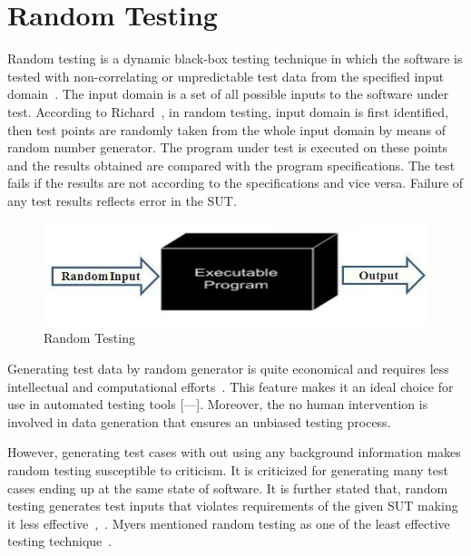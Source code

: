 {\section{Random Testing}
Random testing is a dynamic black-box testing technique in which the software is tested with non-correlating or unpredictable test data from the specified input domain~\cite{Chan2002}. The input domain is a set of all possible inputs to the software under test. According to Richard~\cite{hamlet1994}, in random testing, input domain is first identified, then test points are randomly taken from the whole input domain by means of random number generator. The program under test is executed on these points and the results obtained are compared with the program specifications. The test fails if the results are not according to the specifications and vice versa. Failure of any test results reflects error in the SUT.
\begin{figure}[h]
	\centering
	\includegraphics[scale=0.5]{Literature/randomTesting.jpg}
	\caption{Random Testing}
\end{figure}

Generating test data by random generator is quite economical and requires less intellectual and computational efforts~\cite{Ciupa2008a}. This feature makes it an ideal choice for use in automated testing tools [---]. Moreover, the no human intervention is involved in data generation that ensures an unbiased testing process.

However, generating test cases with out using any background information makes random testing susceptible to criticism. It is criticized for generating many test cases ending up at the same state of software. It is further stated that, random testing generates test inputs that violates requirements of the given SUT making it less effective~\cite{sen2007effective},~\cite{pacheco2009directed}. Myers mentioned random testing as one of the least effective testing technique~\cite{Myers1979}.

}
